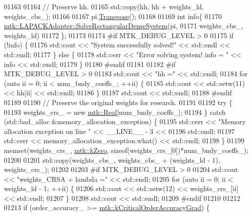 \begin{DoxyCode}
{{01163 
01164   \textcolor{comment}{// Preserve hh.}
01165   std::copy(hh, hh + weights\_ld, weights\_cbs\_);
01166 
01167   pi.\hyperlink{classmtk_1_1DenseMatrix_a71d9c07ca66e88d97d1fd5012f43138b}{Transpose}();
01168 
01169   \textcolor{keywordtype}{int} info\{
01170     \hyperlink{classmtk_1_1LAPACKAdapter_a380f148ffdf96bae2f79ae28f1a6560c}{mtk::LAPACKAdapter::SolveRectangularDenseSystem}(pi,
01171                                                     weights\_cbs\_, weights\_ld)
01172   \};
01173 
01174 \textcolor{preprocessor}{  #if MTK\_DEBUG\_LEVEL > 0}
01175   \textcolor{keywordflow}{if} (!info) \{
01176     std::cout << \textcolor{stringliteral}{"System successfully solved!"} << std::endl << std::endl;
01177   \} \textcolor{keywordflow}{else} \{
01178     std::cerr << \textcolor{stringliteral}{"Error solving system! info = "} << info << std::endl;
01179   \}
01180 \textcolor{preprocessor}{  #endif}
01181 
01182 \textcolor{preprocessor}{  #if MTK\_DEBUG\_LEVEL > 0}
01183   std::cout << \textcolor{stringliteral}{"hh ="} << std::endl;
01184   \textcolor{keywordflow}{for} (\textcolor{keyword}{auto} ii = 0; ii < num\_bndy\_coeffs\_; ++ii) \{
01185     std::cout << std::setw(11) << hh[ii] << std::endl;
01186   \}
01187   std::cout << std::endl;
01188 \textcolor{preprocessor}{  #endif}
01189 
01190   \textcolor{comment}{// Preserve the original weights for research.}
01191 
01192   \textcolor{keywordflow}{try} \{
01193     weights\_crs\_ = \textcolor{keyword}{new} \hyperlink{group__c01-roots_gac080bbbf5cbb5502c9f00405f894857d}{mtk::Real}[num\_bndy\_coeffs\_];
01194   \} \textcolor{keywordflow}{catch} (std::bad\_alloc &memory\_allocation\_exception) \{
01195     std::cerr << \textcolor{stringliteral}{"Memory allocation exception on line "} << \_\_LINE\_\_ - 3 <<
01196       std::endl;
01197     std::cerr << memory\_allocation\_exception.what() << std::endl;
01198   \}
01199   memset(weights\_crs\_, \hyperlink{group__c01-roots_ga59a451a5fae30d59649bcda274fea271}{mtk::kZero}, \textcolor{keyword}{sizeof}(weights\_crs\_[0])*num\_bndy\_coeffs\_);
01200 
01201   std::copy(weights\_cbs\_, weights\_cbs\_ + (weights\_ld - 1), weights\_crs\_);
01202 
01203 \textcolor{preprocessor}{  #if MTK\_DEBUG\_LEVEL > 0}
01204   std::cout << \textcolor{stringliteral}{"weights\_CRSA + lambda ="} << std::endl;
01205   \textcolor{keywordflow}{for} (\textcolor{keyword}{auto} ii = 0; ii < weights\_ld - 1; ++ii) \{
01206     std::cout << std::setw(12) << weights\_crs\_[ii] << std::endl;
01207   \}
01208   std::cout << std::endl;
01209 \textcolor{preprocessor}{  #endif}
01210 
01212 
01213   \textcolor{keywordflow}{if} (order\_accuracy\_ >= \hyperlink{group__c01-roots_ga295dd2f403c775ecd942c22b5a777496}{mtk::kCriticalOrderAccuracyGrad}) \{
}}
\end{DoxyCode}
